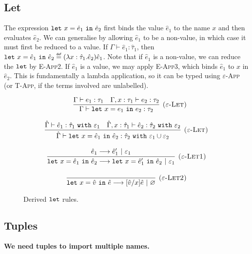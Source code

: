 \subsection{Let}

\noindent
The expression $\mathtt{let}~ x = \hat e_1~\mathtt{in}~ \hat e_2$ first binds the value $\hat e_1$ to the name $x$ and then evaluates $\hat e_2$. We can generalise by allowing $\hat e_1$ to be a non-value, in which case it must first be reduced to a value. If $\Gamma \vdash \hat e_1: \hat \tau_1$, then $\letxpr{x}{\hat e_1}{\hat e_2} \defn (\lambda x: \hat \tau_1 . \hat e_2) \hat e_1$. Note that if $\hat e_1$ is a non-value, we can reduce the $\mathtt{let}$ by \textsc{E-App2}. If $\hat e_1$ is a value, we may apply \textsc{E-App3}, which binds $\hat e_1$ to $x$ in $\hat e_2$. This is fundamentally a lambda application, so it can be typed using \textsc{$\varepsilon$-App} (or \textsc{T-App}, if the terms involved are unlabelled).

\begin{figure}[h]


\[
\begin{array}{c}

	~~~
	
	\infer[\textsc{($\varepsilon$-Let)}]
	{\Gamma \vdash \letxpr{x}{e_1}{e_2}: \tau_2}
	{\Gamma \vdash e_1: \tau_1 & \Gamma, x: \tau_1 \vdash e_2: \tau_2}
	
	

\end{array}
\]


\[
\begin{array}{c}


\infer[\textsc{($\varepsilon$-Let)}]
	{\hat \Gamma \vdash \letxpr{x}{\hat e_1}{\hat e_2} : \hat \tau_2~\kw{with} \varepsilon_1 \cup \varepsilon_2}
	{\hat \Gamma \vdash \hat e_1 : \hat \tau_1~\kw{with} \varepsilon_1 & \hat \Gamma, x: \hat \tau_1 \vdash \hat e_2: \hat \tau_2~\kw{with} \varepsilon_2}
	

\end{array}
\]


\[
\begin{array}{c}

\infer[\textsc{($\varepsilon$-Let1)}]
	{\letxpr{x}{\hat e_1}{\hat e_2} \longrightarrow \letxpr{x}{\hat e_1'}{\hat e_2}~|~\varepsilon_1}
	{\hat e_1 \longrightarrow \hat e_1'~|~\varepsilon_1} \\[3ex]
	
\infer[\textsc{($\varepsilon$-Let2)}]
	{\letxpr{x}{\hat v}{\hat e} \longrightarrow [\hat v/x]\hat e~|~\varnothing}
	{} 

\end{array}
\]


\caption{Derived $\mathtt{let}$ rules.}
\label{This is the label.}
\end{figure}

\subsection{Tuples}

\textbf{We need tuples to import multiple names.}

